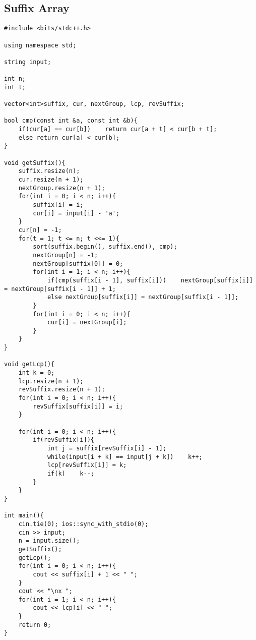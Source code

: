\documentclass[landscape, 8pt, a4paper, oneside, twocolumn]{extarticle}
\begin{document}
    \subsection{Suffix Array}
    \begin{verbatim}
#include <bits/stdc++.h>

using namespace std;

string input;

int n;
int t;

vector<int>suffix, cur, nextGroup, lcp, revSuffix;

bool cmp(const int &a, const int &b){
    if(cur[a] == cur[b])    return cur[a + t] < cur[b + t];
    else return cur[a] < cur[b];
}

void getSuffix(){
    suffix.resize(n);
    cur.resize(n + 1);
    nextGroup.resize(n + 1);
    for(int i = 0; i < n; i++){
        suffix[i] = i;
        cur[i] = input[i] - 'a';
    }
    cur[n] = -1;
    for(t = 1; t <= n; t <<= 1){
        sort(suffix.begin(), suffix.end(), cmp);
        nextGroup[n] = -1;
        nextGroup[suffix[0]] = 0;
        for(int i = 1; i < n; i++){
            if(cmp(suffix[i - 1], suffix[i]))    nextGroup[suffix[i]] = nextGroup[suffix[i - 1]] + 1;
            else nextGroup[suffix[i]] = nextGroup[suffix[i - 1]];
        }
        for(int i = 0; i < n; i++){
            cur[i] = nextGroup[i];
        }
    }
}

void getLcp(){
    int k = 0;
    lcp.resize(n + 1);
    revSuffix.resize(n + 1);
    for(int i = 0; i < n; i++){
        revSuffix[suffix[i]] = i;
    }

    for(int i = 0; i < n; i++){
        if(revSuffix[i]){
            int j = suffix[revSuffix[i] - 1];
            while(input[i + k] == input[j + k])    k++;
            lcp[revSuffix[i]] = k;
            if(k)    k--;
        }
    }
}

int main(){
    cin.tie(0); ios::sync_with_stdio(0);
    cin >> input;
    n = input.size();
    getSuffix();
    getLcp();
    for(int i = 0; i < n; i++){
        cout << suffix[i] + 1 << " ";
    }
    cout << "\nx ";
    for(int i = 1; i < n; i++){
        cout << lcp[i] << " ";
    }
    return 0;
}
    \end{verbatim}
\end{document}
